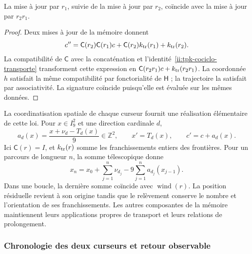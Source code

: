 \begin{proposition}
\label{ii:tpk-composicion-afin}
La mise à jour par \(r_1\), suivie de la mise à jour par \(r_2\), coïncide avec la mise à jour par \(r_2r_1\).
\end{proposition}
\begin{proof}
Deux mises à jour de la mémoire donnent
\[
 c''=\mathsf C(r_2)\mathsf C(r_1)c
       +\mathsf C(r_2)k_{\rm tr}(r_1)+k_{\rm tr}(r_2).
\]
La compatibilité de \(\mathsf C\) avec la concaténation et l'identité~\eqref{ii:tpk-cociclo-transporte} transforment cette expression en \(\mathsf C(r_2r_1)c+k_{\rm tr}(r_2r_1)\). La coordonnée \(h\) satisfait la même compatibilité par fonctorialité de \(\mathsf H\) ; la trajectoire la satisfait par associativité. La signature coïncide puisqu'elle est évaluée sur les mêmes données.
\end{proof}

La coordinatisation spatiale de chaque curseur fournit une réalisation élémentaire de cette loi. Pour \(x\in I_9^2\) et une direction cardinale \(d\),
\[
 a_d(x)=\frac{x+\nu_d-T_d(x)}9\in\mathbb Z^2,
 \qquad x'=T_d(x),\qquad c'=c+a_d(x).
\]
Ici \(\mathsf C(r)=I\), et \(k_{\rm tr}(r)\) somme les franchissements entiers des frontières. Pour un parcours de longueur \(n\), la somme télescopique donne
\[
 x_n=x_0+\sum_{j=1}^n\nu_{d_j}
             -9\sum_{j=1}^n a_{d_j}(x_{j-1}).
\]
Dans une boucle, la dernière somme coïncide avec \(\operatorname{wind}(r)\). La position résiduelle revient à son origine tandis que le relèvement conserve le nombre et l'orientation de ses franchissements. Les autres composantes de la mémoire maintiennent leurs applications propres de transport et leurs relations de prolongement.

\subsubsection{Chronologie des deux curseurs et retour observable}

